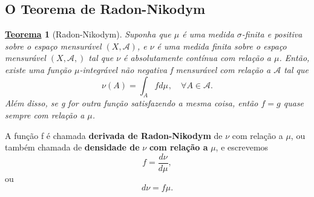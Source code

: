 \documentclass{article}
\newtheorem*{theorem*}{\underline{Teorema}}
\begin{document}
\subsection{O Teorema de Radon-Nikodym}
 \hypertarget{radon_nikodym}{
   \begin{theorem*}[Radon-Nikodym]
    Suponha que \(\mu \) é uma medida \(\sigma \)-finita e positiva sobre o espaço mensurável \((X, \mathcal{A})\), e \(\nu \) é uma medida finita sobre o espaço mensurável \((X, \mathcal{A},)\) tal que \(\nu \) é absolutamente
    contínua com relação a \(\mu \). Então, existe uma função \(\mu \)-integrável não negativa f mensurável com relação a \(\mathcal{A}\) tal que 
      \[
        \nu (A) = \int_{A}f d\mu_{},\quad \forall A\in \mathcal{A}.
      \]
    Além disso, se g for outra função satisfazendo a mesma coisa, então \(f = g\) quase sempre com relação a \(\mu \).
  \end{theorem*}}
  A função f é chamada \textbf{derivada de Radon-Nikodym} de \(\nu \) com relação a \(\mu \), ou também chamada de \textbf{densidade de }\(\nu \) \textbf{com relação a }\(\mu \), e escrevemos 
    \[
      f= \frac{d\nu }{d\mu },
    \]
  ou 
    \[
      d\nu = f\mu.
    \]
\end{document}
